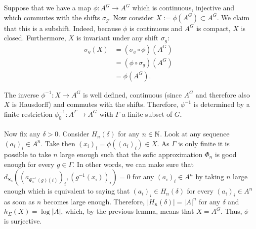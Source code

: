 Suppose that we have a map $\phi: A^G \to A^G$ which is continuous, injective and which commutes with the shifts $\sigma_g$. Now consider $X := \phi(A^G) \subset A^G$. We claim that this is a subshift. Indeed, because $\phi$ is continuous and $A^G$ is compact, $X$ is closed. Furthermore, $X$ is invariant under any shift $\sigma_g$: 
		\begin{align*}
		\sigma_g(X)
		&= (\sigma_g \circ \phi) (A^G) \\
		&= (\phi \circ \sigma_g)(A^G) \\
		&= \phi(A^G).
		\end{align*}
		
The inverse $\phi^{-1}: X \to A^G$ is well defined, continuous (since $A^G$ and therefore also $X$ is Hausdorff) and commutes with the shifts. Therefore,  $\phi^{-1}$ is determined by a finite restriction $\phi^{-1}_0: A^{\Gamma} \to A^G$ with $\Gamma$ a finite subset of $G$. \\
\\
Now fix any $\delta > 0$. Consider $H_n(\delta)$ for any $n \in \mathbb{N}$. Look at any sequence $(a_i)_i \in A^n$. Take then $(x_i)_i = \phi((a_i)_i) \in X$. As $\Gamma$ is only finite it is possible to take $n$ large enough such that the sofic approximation $\Phi_n$ is good enough for every $g \in \Gamma$. In other words, we can make sure that $d_{S_n}((a_{\Phi^{-1}_n(g)(i)})_i,(g^{-1}(x_i))_i) = 0$ for any  $(a_i)_i \in A^n$ by taking $n$ large enough which is equivalent to saying that $(a_i)_i \in H_n(\delta)$ for every $(a_i)_i \in A^n$ as soon as $n$ becomes large enough. Therefore, $|H_n(\delta)| = |A|^{n}$ for any $\delta$ and $h_\Sigma(X) = \log |A|$, which, by the previous lemma, means that $X = A^G$. Thus, $\phi$ is surjective.